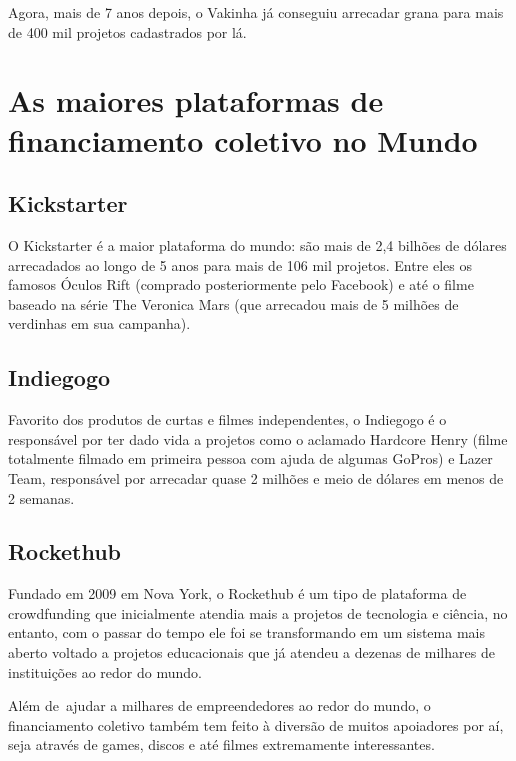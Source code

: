 \documentclass{classe_cn}                 %
\begin{document}
Agora, mais de 7 anos depois, o Vakinha já conseguiu arrecadar grana para mais de 400 mil projetos cadastrados por lá.

\section{As maiores plataformas de financiamento coletivo no Mundo}

\subsection{Kickstarter}

O Kickstarter é a maior plataforma do mundo: são mais de 2,4 bilhões de dólares arrecadados ao longo de 5 anos para mais de 106 mil projetos. Entre eles os famosos Óculos Rift (comprado posteriormente pelo Facebook) e até o filme baseado na série The Veronica Mars (que arrecadou mais de 5 milhões de verdinhas em sua campanha).

\subsection{Indiegogo}

Favorito dos produtos de curtas e filmes independentes, o Indiegogo é o responsável por ter dado vida a projetos como o aclamado Hardcore Henry (filme totalmente filmado em primeira pessoa com ajuda de algumas GoPros) e Lazer Team, responsável por arrecadar quase 2 milhões e meio de dólares em menos de 2 semanas.

\subsection{Rockethub}

Fundado em 2009 em Nova York, o Rockethub é um tipo de plataforma de crowdfunding que inicialmente atendia mais a projetos de tecnologia e ciência, no entanto, com o passar do tempo ele foi se transformando em um sistema mais aberto voltado a projetos educacionais que já atendeu a dezenas de milhares de instituições ao redor do mundo.

Além de ajudar a milhares de empreendedores ao redor do mundo, o financiamento coletivo também tem feito à diversão de muitos apoiadores por aí, seja através de games, discos e até filmes extremamente interessantes.

\end{document}
